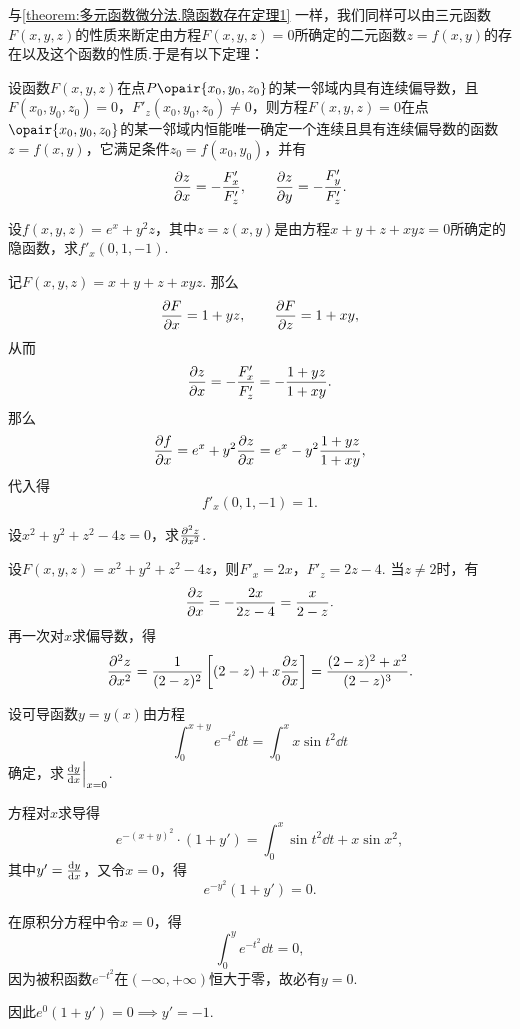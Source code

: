 与\cref{theorem:多元函数微分法.隐函数存在定理1} 一样，我们同样可以由三元函数\(F(x,y,z)\)的性质来断定由方程\(F(x,y,z) = 0\)所确定的二元函数\(z = f(x,y)\)的存在以及这个函数的性质.于是有以下定理：
\begin{theorem}[隐函数存在定理2]\label{theorem:多元函数微分法.隐函数存在定理2}
设函数\(F(x,y,z)\)在点\(P\opair{x_0,y_0,z_0}\)的某一邻域内具有连续偏导数，且\(F(x_0,y_0,z_0)=0\)，\(F'_z(x_0,y_0,z_0) \neq 0\)，则方程\(F(x,y,z)=0\)在点\(\opair{x_0,y_0,z_0}\)的某一邻域内恒能唯一确定一个连续且具有连续偏导数的函数\(z=f(x,y)\)，它满足条件\(z_0=f(x_0,y_0)\)，并有
\begin{equation}\label{equation:多元函数微分法.隐函数存在定理2.一阶偏导数}
\pdv{z}{x}=-\frac{F'_x}{F'_z},
\qquad
\pdv{z}{y}=-\frac{F'_y}{F'_z}.
\end{equation}
\end{theorem}

\begin{example}
设\(f(x,y,z) = e^x + y^2 z\)，其中\(z=z(x,y)\)是由方程\(x+y+z+xyz=0\)所确定的隐函数，求\(f'_x(0,1,-1)\).
\begin{solution}
记\(F(x,y,z) = x+y+z+xyz\).
那么\[
\pdv{F}{x} = 1+yz, \qquad
\pdv{F}{z} = 1+xy,
\]从而\[
\pdv{z}{x} = -\frac{F'_x}{F'_z}
= -\frac{1+yz}{1+xy}.
\]那么\[
\pdv{f}{x}
= e^x + y^2 \pdv{z}{x}
= e^x - y^2 \frac{1+yz}{1+xy},
\]代入得\[
f'_x(0,1,-1) = 1.
\]
\end{solution}
\end{example}

\begin{example}
设\(x^2+y^2+z^2-4z=0\)，求\(\pdv[2]{z}{x}\).
\begin{solution}
设\(F(x,y,z) = x^2+y^2+z^2-4z\)，则\(F'_x = 2x\)，\(F'_z = 2z-4\).
当\(z\neq2\)时，有\[
\pdv{z}{x} = -\frac{2x}{2z-4} = \frac{x}{2-z}.
\]再一次对\(x\)求偏导数，得\[
\pdv[2]{z}{x}
= \frac{1}{(2-z)^2} \left[ (2-z)+x\pdv{z}{x} \right]
= \frac{(2-z)^2+x^2}{(2-z)^3}.
\]
\end{solution}
\end{example}

\begin{example}
设可导函数\(y = y(x)\)由方程\[
\int_0^{x+y} e^{-t^2} \dd{t}
= \int_0^x x \sin t^2 \dd{t}
\]确定，求\(\eval{\dv{y}{x}}_{x=0}\).
\begin{solution}
方程对\(x\)求导得\[
e^{-(x+y)^2} \cdot (1+y')
= \int_0^x \sin t^2 \dd{t} + x \sin x^2,
\]其中\(y' = \dv{y}{x}\)，又令\(x=0\)，得\[
e^{-y^2} (1+y') = 0.
\]

在原积分方程中令\(x=0\)，得\[
\int_0^y e^{-t^2} \dd{t} = 0,
\]因为被积函数\(e^{-t^2}\)在\((-\infty,+\infty)\)恒大于零，故必有\(y = 0\).

因此\(e^0 (1+y') = 0 \implies y'=-1\).
\end{solution}
\end{example}

